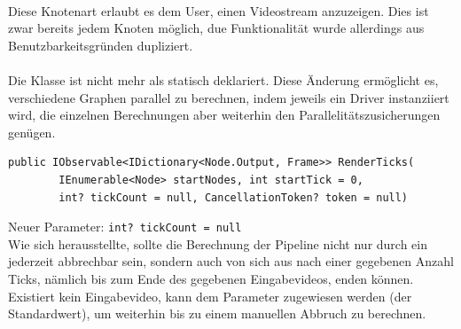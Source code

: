 \paragraph{}
Diese Knotenart erlaubt es dem User, einen Videostream anzuzeigen. Dies ist zwar bereits jedem Knoten möglich, due Funktionalität wurde allerdings aus Benutzbarkeitsgründen dupliziert.

\paragraph{}
\begin{itemize}
	\change Die Klasse ist nicht mehr als statisch deklariert. Diese Änderung ermöglicht es, verschiedene Graphen parallel zu berechnen, indem jeweils ein Driver instanziiert wird, die einzelnen Berechnungen aber weiterhin den Parallelitätszusicherungen genügen.
	\add \begin{verbatim}public IObservable<IDictionary<Node.Output, Frame>> RenderTicks(
	    IEnumerable<Node> startNodes, int startTick = 0,
	    int? tickCount = null, CancellationToken? token = null)
	\end{verbatim}
	Neuer Parameter: \verb!int? tickCount = null! \\ 
	Wie sich herausstellte, sollte die Berechnung der Pipeline nicht nur durch ein  jederzeit abbrechbar sein, sondern auch von sich aus nach einer gegebenen Anzahl Ticks, nämlich bis zum Ende des gegebenen Eingabevideos, enden können. Existiert kein Eingabevideo, kann dem Parameter  zugewiesen werden (der Standardwert), um weiterhin bis zu einem manuellen Abbruch zu berechnen.
\end{itemize}

